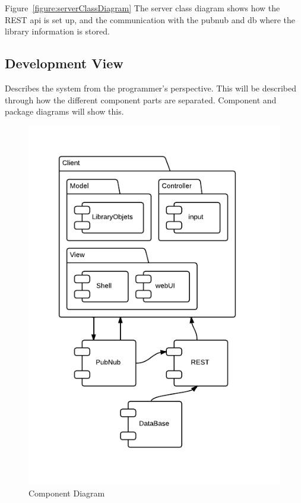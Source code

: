 Figure~\ref{figure:serverClassDiagram} The server class diagram shows how the REST api is set up, and the communication with the pubnub and db where the library information is stored.



\subsection{Development View}
Describes the system from the programmer's perspective. This will be described through how the different component parts are separated. Component and package diagrams will show this.

\begin{figure}
\centering
\includegraphics[width=6in]{image/ComponentDiagram.png}
\caption{Component Diagram}
\label{figure:componentDiagram}
\end{figure}

